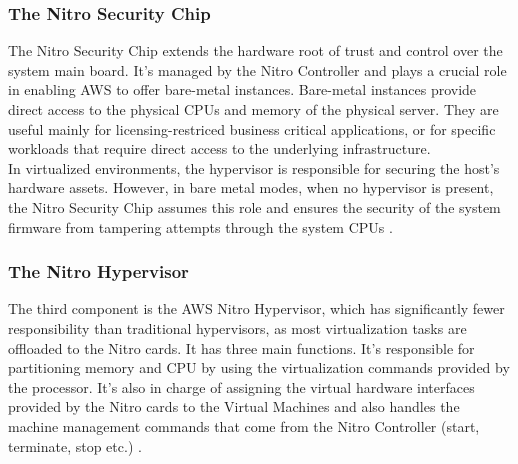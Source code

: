 \subsubsection{The Nitro Security Chip}
The Nitro Security Chip extends the hardware root of trust and control over the system main board. It's 
managed by the Nitro Controller and plays a crucial role in enabling 
AWS to offer bare-metal instances. Bare-metal instances provide direct access to the physical CPUs and memory 
of the physical server. They are useful mainly for licensing-restriced business critical applications, or for 
specific workloads that require direct access to the underlying infrastructure. \\ 
In virtualized environments, the hypervisor is responsible for securing the host's hardware assets. 
However, in bare metal modes, when no hypervisor is present, the Nitro Security Chip 
assumes this role and ensures the security of the system firmware from tampering attempts through the system 
CPUs \cite{nitro_whitepaper}. 

\subsubsection{The Nitro Hypervisor}
The third component is the AWS Nitro Hypervisor, which has significantly fewer responsibility than traditional
hypervisors, as most virtualization tasks are offloaded to the Nitro cards. It has three main functions.
It's responsible for partitioning memory and CPU by using the virtualization commands provided by the 
processor. It's also in charge of assigning the virtual hardware interfaces provided by 
the Nitro cards to the Virtual Machines and also handles the machine management commands that come from 
the Nitro Controller (start, terminate, stop etc.) \cite{nitro_whitepaper}. 

